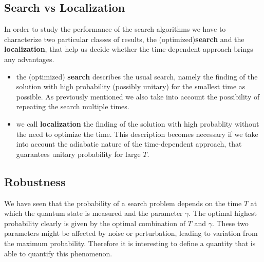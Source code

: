     \subsection{Search vs Localization}
      In order to study the performance of the search algorithms we have to characterize two particular classes of results, the (optimized)\textbf{search} and the \textbf{localization}, that help us decide whether the time-dependent approach brings any advantages.
      \begin{itemize}
          \item the (optimized) \textbf{search} describes the usual search, namely the finding of the solution with high probability (possibly unitary) for the smallest time as possible. As previously mentioned we also take into account the possibility of repeating the search multiple times.
          \item we call \textbf{localization} the finding of the solution with high probablity without the need to optimize the time. This description becomes necessary if we take into account the adiabatic nature of the time-dependent approach, that guarantees unitary probability for large $T$.
      \end{itemize}

    \subsection{Robustness}\label{subsec:robustness}
        We have seen that the probability of a search problem depends on the time $T$ at which the quantum state is measured and the parameter $\gamma$. The optimal highest probability clearly is given by the optimal combination of $T$ and $\gamma$. These two parameters might be affected by noise or perturbation, leading to variation from the maximum probability. Therefore it is interesting to define a quantity that is able to quantify this phenomenon.


